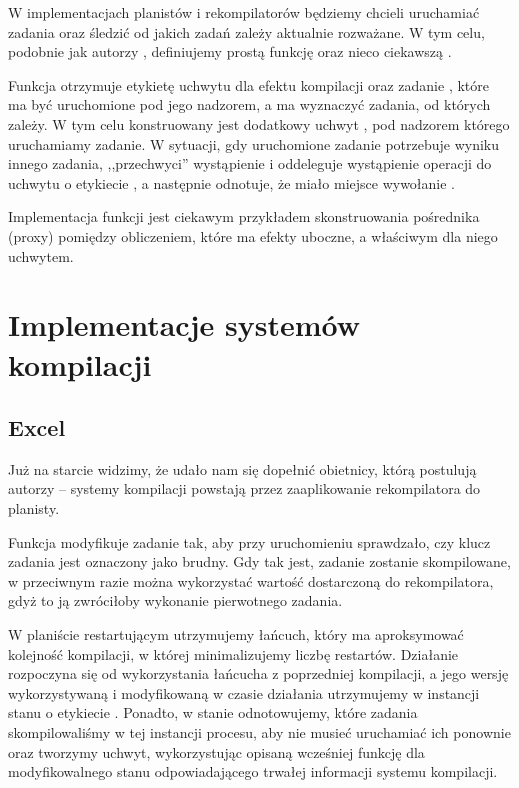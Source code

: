 W implementacjach planistów i rekompilatorów będziemy chcieli uruchamiać zadania oraz śledzić od jakich zadań zależy aktualnie rozważane. W tym celu, podobnie jak autorzy \BSaLC{}, definiujemy prostą funkcję  oraz nieco ciekawszą .



Funkcja  otrzymuje etykietę  uchwytu dla efektu kompilacji oraz zadanie , które ma być uruchomione pod jego nadzorem, a  ma wyznaczyć zadania, od których  zależy. W tym celu konstruowany jest dodatkowy uchwyt , pod nadzorem którego uruchamiamy zadanie. W sytuacji, gdy uruchomione zadanie potrzebuje wyniku innego zadania,  ,,przechwyci'' wystąpienie  i oddeleguje wystąpienie operacji do uchwytu o etykiecie , a następnie odnotuje, że miało miejsce wywołanie .

Implementacja funkcji  jest ciekawym przykładem skonstruowania pośrednika (proxy) pomiędzy obliczeniem, które ma efekty uboczne, a właściwym dla niego uchwytem.

\pagebreak

\section{Implementacje systemów kompilacji}

\subsection{Excel}



Już na starcie widzimy, że udało nam się dopełnić obietnicy, którą postulują autorzy \BSaLC{} -- systemy kompilacji powstają przez zaaplikowanie rekompilatora do planisty.

Funkcja  modyfikuje zadanie tak, aby przy uruchomieniu sprawdzało, czy klucz zadania jest oznaczony jako brudny. Gdy tak jest, zadanie zostanie skompilowane, w przeciwnym razie można wykorzystać wartość dostarczoną do rekompilatora, gdyż to ją zwróciłoby wykonanie pierwotnego zadania. 



W planiście restartującym utrzymujemy łańcuch, który ma aproksymować kolejność kompilacji, w której minimalizujemy liczbę restartów. Działanie rozpoczyna się od wykorzystania łańcucha z poprzedniej kompilacji, a jego wersję wykorzystywaną i modyfikowaną w czasie działania utrzymujemy w instancji stanu o etykiecie . Ponadto, w stanie  odnotowujemy, które zadania skompilowaliśmy w tej instancji procesu, aby nie musieć uruchamiać ich ponownie oraz tworzymy uchwyt, wykorzystując opisaną wcześniej funkcję  dla modyfikowalnego stanu odpowiadającego trwałej informacji systemu kompilacji.

